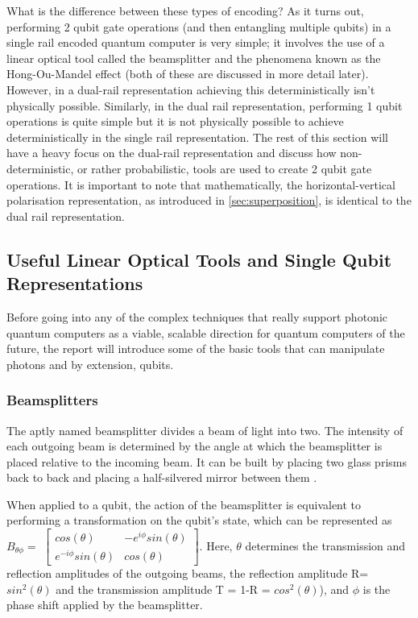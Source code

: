 What is the difference between these types of encoding? As it turns out, performing 2 qubit gate operations (and then entangling multiple qubits) in a single rail encoded quantum computer is very simple; it involves the use of a linear optical tool called the beamsplitter and the phenomena known as the Hong-Ou-Mandel effect \cite{PhysRevLett.59.2044}(both of these are discussed in more detail later). However, in a dual-rail representation achieving this deterministically isn't physically possible. Similarly, in the dual rail representation, performing 1 qubit operations is quite simple but it is not physically possible to achieve deterministically in the single rail representation. The rest of this section will have a heavy focus on the dual-rail representation and discuss how non-deterministic, or rather probabilistic, tools are used to create 2 qubit gate operations. It is important to note that mathematically, the horizontal-vertical polarisation representation, as introduced in \cref{sec:superposition}, is identical to the dual rail representation. 



\subsection{Useful Linear Optical Tools and Single Qubit Representations}
Before going into any of the complex techniques that really support photonic quantum computers as a viable, scalable direction for quantum computers of the future, the report will introduce some of the basic tools that can manipulate photons and by extension, qubits.
\subsubsection{Beamsplitters}

The aptly named beamsplitter divides a beam of light into two. The intensity of each outgoing beam is determined by the angle at which the beamsplitter is placed relative to the incoming beam. It can be built by placing two glass prisms back to back and placing a half-silvered mirror between them \cite{nielsen_chuang_2010}. %

When applied to a qubit, the action of the beamsplitter is equivalent to performing a transformation on the qubit's state, which can be represented as $B_{\theta\phi} = $ $\begin{bmatrix}
cos(\theta) & -e^{i\phi}sin(\theta) \\
e^{-i\phi}sin(\theta) & cos(\theta) 
\end{bmatrix}$. \cite{KnillE2001Asfe} Here, $\theta$ determines the transmission and reflection amplitudes of the outgoing beams, the reflection amplitude R= $sin^2(\theta)$ and the transmission amplitude T = 1-R = $cos^2(\theta)$), and $\phi$ is the phase shift applied by the beamsplitter.

